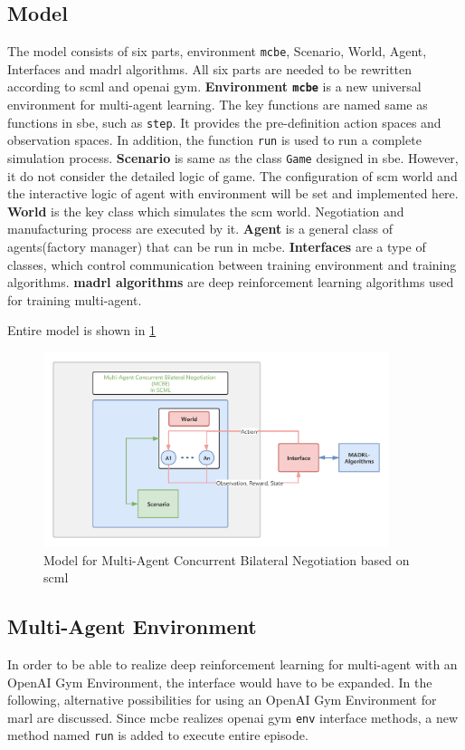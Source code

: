 \subsection{Model}
The model consists of six parts, environment \texttt{\gls{mcbe}}, Scenario, World, Agent, Interfaces and \gls{madrl} algorithms.
All six parts are needed to be rewritten according to \gls{scml} and \gls{openai gym}. 
\textbf{Environment \texttt{\gls{mcbe}}} is a new universal environment for multi-agent learning. The key functions are named same as functions in \gls{sbe}, such as \texttt{step}. It provides the pre-definition action spaces and observation spaces.  In addition, the function \texttt{run} is used to run a complete simulation process. 
\textbf{Scenario} is same as the class \texttt{Game} designed in \gls{sbe}. However, it do not consider the detailed logic of game. The configuration of \gls{scm} world and the interactive logic of agent with environment will be set and implemented here.
\textbf{World} is the key class which simulates the \gls{scm} world. Negotiation and manufacturing process are executed by it.
\textbf{Agent} is a general class of agents(factory manager) that can be run in \gls{mcbe}. 
\textbf{Interfaces} are a type of classes, which control communication between training environment and training algorithms.
\textbf{\gls{madrl} algorithms} are deep reinforcement learning algorithms used for training multi-agent.

Entire model is shown in \ref{fig:environment-multi-agent}

\begin{figure}[htbp]
\centering
\includegraphics[width=0.9\textwidth]{./images/MCBE.png}
\caption{Model for Multi-Agent Concurrent Bilateral Negotiation based on \gls{scml}}
\label{fig:environment-multi-agent}
\end{figure}

\subsection{Multi-Agent Environment} \label{multi-agent-env}
In order to be able to realize deep reinforcement learning for multi-agent with an OpenAI Gym Environment, the interface would have to be expanded. In the following, alternative possibilities for using an OpenAI Gym Environment for \gls{marl} are discussed. 
Since \gls{mcbe} realizes \gls{openai gym} \texttt{env} interface methods, a new method named \texttt{run} is added to execute entire episode.


